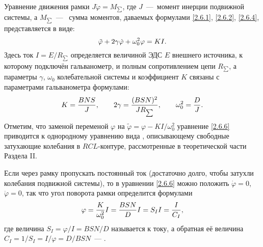 Уравнение движения рамки $J\ddot{\varphi} = M_{\scriptscriptstyle \sum}$, 
где $J$~---~момент инерции подвижной системы, а $M_{\scriptscriptstyle \sum}$~---~
сумма моментов, даваемых формулами \eqref{2.6.1}, \eqref{2.6.2}, \eqref{2.6.4}, 
представляется в виде:
\begin{equation}
	\eqmark{2.6.6}
	\ddot{\varphi} + 2\gamma \dot{\varphi} + \omega^2_{0}\varphi = KI.
\end{equation}
Здесь ток $I = E/R_{\scriptscriptstyle \sum}$ определяется величиной 
ЭДС $E$ внешнего источника, к которому подключён гальванометр, и полным 
сопротивлением цепи $R_{\scriptscriptstyle \sum}$, а параметры $\gamma$, 
$\omega_0$ колебательной системы и коэффициент $K$ связаны с параметрами 
гальванометра формулами:
\begin{equation}
	\eqmark{2.6.7}
	K = \frac{BNS}{J}, \qquad 2\gamma = \frac{(BSN)^2}{JR_{\scriptscriptstyle \sum}}, 
    \qquad \omega^2_0 = \frac{D}{J}.
\end{equation}
Отметим, что заменой переменой $\varphi$ на 
$\tilde{\varphi} = \varphi - KI/\omega^2_0$ уравнение \eqref{2.6.6} приводится 
к однородному уравнению вида , описывающему свободные 
затухающие колебания в $RCL$-контуре, рассмотренные в теоретической части 
Раздела II.

Если через рамку пропускать постоянный ток (достаточно долго, чтобы затухли 
колебания подвижной системы), то в уравнении \eqref{2.6.6} можно положить 
$\dot{\varphi} = 0$, $\ddot{\varphi} = 0$, так что угол поворота рамки 
определится формулами
\begin{equation}
	\eqmark{2.6.8}
	\varphi = \frac{K}{\omega^2_0}I = \frac{BSN}{D}I = S_I I = \frac{I}{C_I},
\end{equation}
где величина $S_I = \varphi/I = BSN/D$ называется 
 к току, а
обратная её величина $C_I = 1/S_I = I/\varphi = D/BSN$~--- 
.


